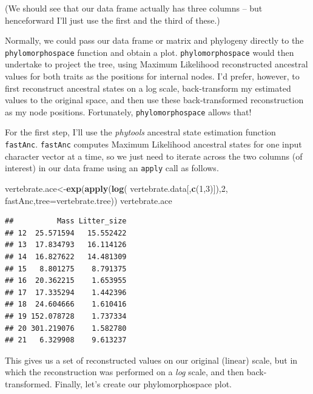 \documentclass[fleqn,10pt,lineno]{wlpeerj} %
\newenvironment{Shaded}{\begin{snugshade}}{\end{snugshade}}
\newcommand{\AttributeTok}[1]{\textcolor[rgb]{0.13,0.29,0.53}{#1}}
\newcommand{\DecValTok}[1]{\textcolor[rgb]{0.00,0.00,0.81}{#1}}
\newcommand{\FunctionTok}[1]{\textcolor[rgb]{0.13,0.29,0.53}{\textbf{#1}}}
\newcommand{\NormalTok}[1]{#1}
\newcommand{\OtherTok}[1]{\textcolor[rgb]{0.56,0.35,0.01}{#1}}
\begin{document}
(We should see that our data frame actually has three columns -- but henceforward I'll just use the first and the third of these.)

Normally, we could pass our data frame or matrix and phylogeny directly to the \texttt{phylomorphospace} function and obtain a plot. \texttt{phylomorphospace} would then undertake to project the tree, using Maximum Likelihood reconstructed ancestral values for both traits as the positions for internal nodes. I'd prefer, however, to first reconstruct ancestral states on a log scale, back-transform my estimated values to the original space, and then use these back-transformed reconstruction as my node positions. Fortunately, \texttt{phylomorphospace} allows that!

For the first step, I'll use the \emph{phytools} ancestral state estimation function \texttt{fastAnc}. \texttt{fastAnc} computes Maximum Likelihood ancestral states for one input character vector at a time, so we just need to iterate across the two columns (of interest) in our data frame using an \texttt{apply} call as follows.

\begin{Shaded}
\begin{Highlighting}[]
\NormalTok{vertebrate.ace}\OtherTok{\textless{}{-}}\FunctionTok{exp}\NormalTok{(}\FunctionTok{apply}\NormalTok{(}\FunctionTok{log}\NormalTok{(}
\NormalTok{  vertebrate.data[,}\FunctionTok{c}\NormalTok{(}\DecValTok{1}\NormalTok{,}\DecValTok{3}\NormalTok{)]),}\DecValTok{2}\NormalTok{,}
\NormalTok{  fastAnc,}\AttributeTok{tree=}\NormalTok{vertebrate.tree))}
\NormalTok{vertebrate.ace}
\end{Highlighting}
\end{Shaded}

\begin{verbatim}
##          Mass Litter_size
## 12  25.571594   15.552422
## 13  17.834793   16.114126
## 14  16.827622   14.481309
## 15   8.801275    8.791375
## 16  20.362215    1.653955
## 17  17.335294    1.442396
## 18  24.604666    1.610416
## 19 152.078728    1.737334
## 20 301.219076    1.582780
## 21   6.329908    9.613237
\end{verbatim}

This gives us a set of reconstructed values on our original (linear) scale, but in which the reconstruction was performed on a \emph{log} scale, and then back-transformed. Finally, let's create our phylomorphospace plot.
\end{document}
